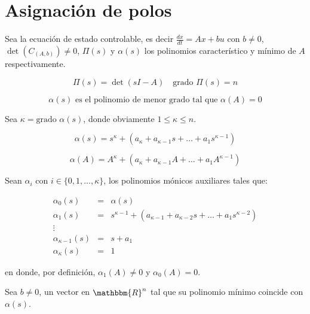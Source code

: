    \newpage
    \section{Asignación de polos}

        Sea la ecuación de estado controlable, es decir $\frac{dx}{dt} = Ax + bu$ con $b \ne 0$, $\det{(C_{(A,b)})} \ne 0$, $\Pi(s)$ y $\alpha(s)$ los polinomios característico y mínimo de $A$ respectivamente.

        \begin{equation}
            \Pi(s) = \det{(sI - A)} \quad \text{grado } \Pi(s) = n \nonumber
        \end{equation}

        \begin{equation}
            \alpha(s) \text{ es el polinomio de menor grado tal que } \alpha(A) = 0 \nonumber
        \end{equation}

        Sea $\kappa = \text{grado } \alpha(s)$, donde obviamente $1 \le \kappa \le n$.

        \begin{equation}
            \alpha(s) = s^{\kappa} + (a_{\kappa} + a_{\kappa - 1} s + \dots + a_1 s^{\kappa - 1}) \nonumber
        \end{equation}

        \begin{equation}
            \alpha(A) = A^{\kappa} + (a_{\kappa} + a_{\kappa - 1} A + \dots + a_1 A^{\kappa - 1}) \nonumber
        \end{equation}

        Sean $\alpha_i$ con $i \in \{ 0, 1, \dots, \kappa \}$, los polinomios mónicos auxiliares tales que:

        \begin{eqnarray}
        \alpha_0(s) & = & \alpha(s) \nonumber \\
        \alpha_1(s) & = & s^{\kappa - 1} + (a_{\kappa - 1} + a_{\kappa - 2} s + \dots + a_1 s^{\kappa - 2}) \nonumber \\
        \vdots \nonumber \\
        \alpha_{\kappa - 1}(s) & = & s + a_1 \nonumber \\
        \alpha_{\kappa}(s) & = & 1 \nonumber
        \end{eqnarray}

        en donde, por definición, $\alpha_1(A) \ne 0$ y $\alpha_0(A) = 0$.

        Sea $b \ne 0$, un vector en $\mathbbm{R}^n$ tal que su polinomio mínimo coincide con $\alpha(s)$.

